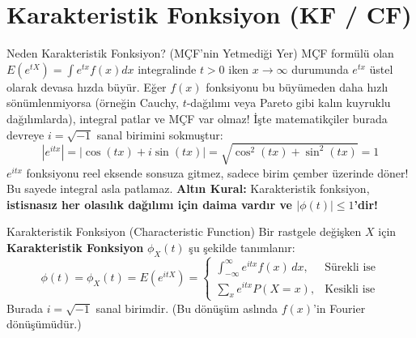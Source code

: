 \documentclass[12pt,a4paper]{article}
\begin{document}
\begin{center}
\end{center}

\vspace{0.5em}
\section{Karakteristik Fonksiyon (KF / CF)}

\begin{sezgi}{Neden Karakteristik Fonksiyon? (MÇF'nin Yetmediği Yer)}
MÇF formülü olan $E(e^{tX}) = \int e^{tx} f(x) dx$ integralinde $t > 0$ iken $x \to \infty$ durumunda $e^{tx}$ üstel olarak devasa hızda büyür. Eğer $f(x)$ fonksiyonu bu büyümeden daha hızlı sönümlenmiyorsa (örneğin Cauchy, $t$-dağılımı veya Pareto gibi kalın kuyruklu dağılımlarda), integral patlar ve MÇF var olmaz!  
İşte matematikçiler burada devreye $i = \sqrt{-1}$ sanal birimini sokmuştur:
\begin{equation}
    |e^{itx}| = |\cos(tx) + i\sin(tx)| = \sqrt{\cos^2(tx) + \sin^2(tx)} = 1
\end{equation}
$e^{itx}$ fonksiyonu reel eksende sonsuza gitmez, sadece birim çember üzerinde döner! Bu sayede integral asla patlamaz.  
\textbf{Altın Kural:} Karakteristik fonksiyon, \textbf{istisnasız her olasılık dağılımı için daima vardır ve $|\phi(t)| \le 1$'dir!}
\end{sezgi}

\begin{tanim}{Karakteristik Fonksiyon (Characteristic Function)}
Bir rastgele değişken $X$ için \textbf{Karakteristik Fonksiyon} $\phi_X(t)$ şu şekilde tanımlanır:
\begin{equation}
    \phi(t) = \phi_X(t) = E(e^{itX}) = 
    \begin{cases}
        \int_{-\infty}^{\infty} e^{itx} f(x) \, dx, & \text{Sürekli ise} \\
        \sum_{x} e^{itx} P(X = x), & \text{Kesikli ise}
    \end{cases}
\end{equation}
Burada $i = \sqrt{-1}$ sanal birimdir. (Bu dönüşüm aslında $f(x)$'in Fourier dönüşümüdür.)
\end{tanim}
\end{document}
